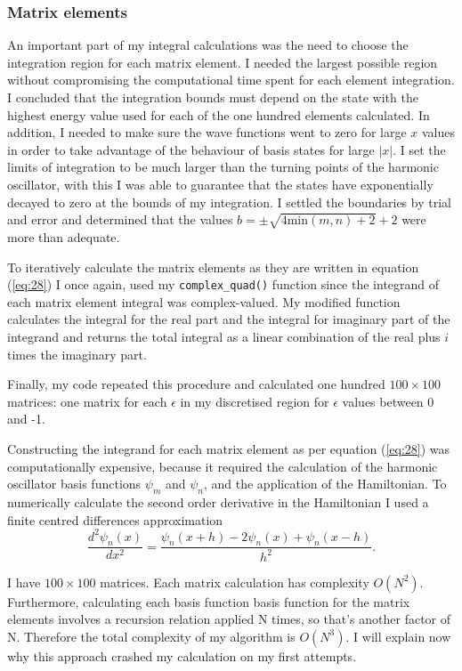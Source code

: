 \documentclass[10pt, a4paper, singlespacing]{report}
\begin{document}
\subsubsection{Matrix elements}\label{Matrix elements}
An important part of my integral calculations was the need to choose the integration region for each matrix element. I needed the largest possible region without compromising the computational time spent for each element integration. I concluded that the integration bounds must depend on the state with the highest energy value used for each of the one hundred elements calculated. In addition, I needed to make sure the wave functions went to zero for large $x$ values in order to take advantage of the behaviour of basis states for large $|x|$. I set the limits of integration to be much larger than the turning points of the harmonic oscillator, with this I was able to guarantee that the states have exponentially decayed to zero at the bounds of my integration. I settled the boundaries by trial and error and determined that the values $b = \pm \sqrt{4 \mathrm{min}(m,n) + 2} + 2$ were more than adequate.

To iteratively calculate the matrix elements as they are written in equation (\ref{eq:28}) I once again, used my \texttt{complex\_quad()} function since the integrand of each matrix element integral was complex-valued. My modified function calculates the integral for the real part and the integral for imaginary part of the integrand and returns the total integral as a linear combination of the real plus $i$ times the imaginary part.

Finally, my code repeated this procedure and calculated one hundred $100\times100$ matrices: one matrix for each $\epsilon$ in my discretised region for $\epsilon$ values between 0 and -1.

Constructing the integrand for each matrix element as per equation (\ref{eq:28}) was computationally expensive, because it required the calculation of the harmonic oscillator basis functions $\psi_m$ and $\psi_n$, and the application of the Hamiltonian. To numerically calculate the second order derivative in the Hamiltonian I used a finite centred differences approximation
\begin{equation}\label{eq:29}
\frac{d^2 \psi_n(x)}{dx^2} = \frac{\psi_n(x + h) - 2 \psi_n(x) + \psi_n(x - h)}{h^2}.
\end{equation}

I have $100\times100$ matrices. Each matrix calculation has complexity $O(N^2)$. Furthermore, calculating each basis function basis function for the matrix elements involves a recursion relation applied N times, so that's another factor of N. Therefore the total complexity of my algorithm is $O(N^3)$. I will explain now why this approach crashed my calculation on my first attempts.
\end{document}
